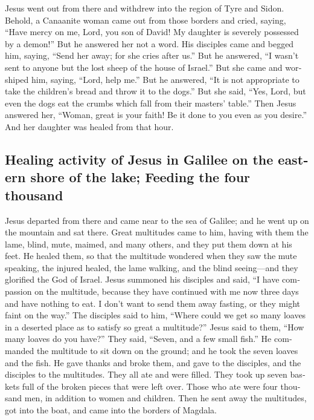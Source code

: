 \begin{paracol}{2}
\begin{otherlanguage}{english}
 Jesus went out from there and withdrew into the region
of Tyre and Sidon.  Behold, a Canaanite woman came out
from those borders and cried, saying, ``Have mercy on me, Lord, you son
of David! My daughter is severely possessed by a demon!''
 But he answered her not a word. His disciples came and
begged him, saying, ``Send her away; for she cries after us.''
 But he answered, ``I wasn't sent to anyone but the lost
sheep of the house of Israel.''  But she came and
worshiped him, saying, ``Lord, help me.''  But he
answered, ``It is not appropriate to take the children's bread and throw
it to the dogs.''  But she said, ``Yes, Lord, but even
the dogs eat the crumbs which fall from their masters' table.''
 Then Jesus answered her, ``Woman, great is your faith!
Be it done to you even as you desire.'' And her daughter was healed from
that hour.

\hypertarget{healing-activity-of-jesus-in-galilee-on-the-eastern-shore-of-the-lake-feeding-the-four-thousand}{%
\subsection{Healing activity of Jesus in Galilee on the eastern shore of
the lake; Feeding the four
thousand}\label{healing-activity-of-jesus-in-galilee-on-the-eastern-shore-of-the-lake-feeding-the-four-thousand}}

 Jesus departed from there and came near to the sea of
Galilee; and he went up on the mountain and sat there. 
Great multitudes came to him, having with them the lame, blind, mute,
maimed, and many others, and they put them down at his feet. He healed
them,  so that the multitude wondered when they saw the
mute speaking, the injured healed, the lame walking, and the blind
seeing---and they glorified the God of Israel.  Jesus
summoned his disciples and said, ``I have compassion on the multitude,
because they have continued with me now three days and have nothing to
eat. I don't want to send them away fasting, or they might faint on the
way.''  The disciples said to him, ``Where could we get
so many loaves in a deserted place as to satisfy so great a multitude?''
 Jesus said to them, ``How many loaves do you have?''
They said, ``Seven, and a few small fish.''  He commanded
the multitude to sit down on the ground;  and he took the
seven loaves and the fish. He gave thanks and broke them, and gave to
the disciples, and the disciples to the multitudes.  They
all ate and were filled. They took up seven baskets full of the broken
pieces that were left over.  Those who ate were four
thousand men, in addition to women and children.  Then he
sent away the multitudes, got into the boat, and came into the borders
of Magdala.


\end{otherlanguage}
\end{paracol}
